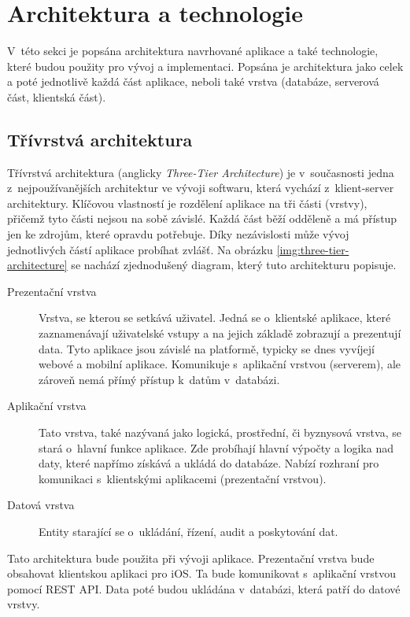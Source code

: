 \documentclass[thesis=M,czech]{FITthesis}[2019/12/23]
\begin{document}
\section{Architektura a technologie}
V~této sekci je popsána architektura navrhované aplikace a také technologie, které budou použity pro vývoj a implementaci. Popsána je architektura jako celek a poté jednotlivě každá část aplikace, neboli také vrstva (databáze, serverová část, klientská část).

\subsection{Třívrstvá architektura}
Třívrstvá architektura (anglicky \textit{Three-Tier Architecture}) je v~současnosti jedna z~nejpoužívanějších architektur ve vývoji softwaru, která vychází z~klient-server architektury. Klíčovou vlastností je rozdělení aplikace na tři části (vrstvy), přičemž tyto části nejsou na sobě závislé. Každá část běží odděleně a má přístup jen ke zdrojům, které opravdu potřebuje. Díky nezávislosti může vývoj jednotlivých částí aplikace probíhat zvlášť. Na obrázku \ref{img:three-tier-architecture} se nachází zjednodušený diagram, který tuto architekturu popisuje. \cite{three-tier-architecture-1, three-tier-architecture-2}

\begin{description}
    \item[Prezentační vrstva] Vrstva, se kterou se setkává uživatel. Jedná se o~klientské aplikace, které zaznamenávají uživatelské vstupy a na jejich základě zobrazují a prezentují data. Tyto aplikace jsou závislé na platformě, typicky se dnes vyvíjejí webové a mobilní aplikace. Komunikuje s~aplikační vrstvou (serverem), ale zároveň nemá přímý přístup k~datům v~databázi.
    \item[Aplikační vrstva] Tato vrstva, také nazývaná jako logická, prostřední, či byznysová vrstva, se stará o~hlavní funkce aplikace. Zde probíhají hlavní výpočty a logika nad daty, které napřímo získává a ukládá do databáze. Nabízí rozhraní pro komunikaci s~klientskými aplikacemi (prezentační vrstvou).
    \item[Datová vrstva] Entity starající se o~ukládání, řízení, audit a poskytování dat.
\end{description}

Tato architektura bude použita při vývoji aplikace. Prezentační vrstva bude obsahovat klientskou aplikaci pro iOS. Ta bude komunikovat s~aplikační vrstvou pomocí REST API. Data poté budou ukládána v~databázi, která patří do datové vrstvy.
\end{document}
